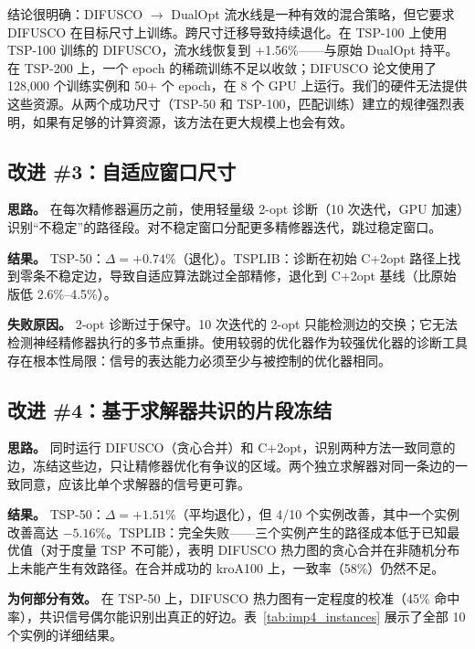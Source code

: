 \documentclass[11pt,a4paper]{ctexart}
\begin{document}
结论很明确：DIFUSCO $\rightarrow$ DualOpt 流水线是一种有效的混合策略，但它要求 DIFUSCO 在目标尺寸上训练。跨尺寸迁移导致持续退化。在 TSP-100 上使用 TSP-100 训练的 DIFUSCO，流水线恢复到 +1.56\%——与原始 DualOpt 持平。在 TSP-200 上，一个 epoch 的稀疏训练不足以收敛；DIFUSCO 论文使用了 128,000 个训练实例和 50+ 个 epoch，在 8 个 GPU 上运行。我们的硬件无法提供这些资源。从两个成功尺寸（TSP-50 和 TSP-100，匹配训练）建立的规律强烈表明，如果有足够的计算资源，该方法在更大规模上也会有效。

\subsection{改进 \#3：自适应窗口尺寸}

\textbf{思路。} 在每次精修器遍历之前，使用轻量级 2-opt 诊断（10 次迭代，GPU 加速）识别``不稳定''的路径段。对不稳定窗口分配更多精修器迭代，跳过稳定窗口。

\textbf{结果。} TSP-50：$\Delta = +0.74\%$（退化）。TSPLIB：诊断在初始 C+2opt 路径上找到零条不稳定边，导致自适应算法跳过全部精修，退化到 C+2opt 基线（比原始版低 2.6\%--4.5\%）。

\textbf{失败原因。} 2-opt 诊断过于保守。10 次迭代的 2-opt 只能检测边的交换；它无法检测神经精修器执行的多节点重排。使用较弱的优化器作为较强优化器的诊断工具存在根本性局限：信号的表达能力必须至少与被控制的优化器相同。

\subsection{改进 \#4：基于求解器共识的片段冻结}

\textbf{思路。} 同时运行 DIFUSCO（贪心合并）和 C+2opt，识别两种方法一致同意的边，冻结这些边，只让精修器优化有争议的区域。两个独立求解器对同一条边的一致同意，应该比单个求解器的信号更可靠。

\textbf{结果。} TSP-50：$\Delta = +1.51\%$（平均退化），但 4/10 个实例改善，其中一个实例改善高达 $-5.16\%$。TSPLIB：完全失败——三个实例产生的路径成本低于已知最优值（对于度量 TSP 不可能），表明 DIFUSCO 热力图的贪心合并在非随机分布上未能产生有效路径。在合并成功的 kroA100 上，一致率（58\%）仍然不足。

\textbf{为何部分有效。} 在 TSP-50 上，DIFUSCO 热力图有一定程度的校准（45\% 命中率），共识信号偶尔能识别出真正的好边。表~\ref{tab:imp4_instances} 展示了全部 10 个实例的详细结果。
\end{document}
